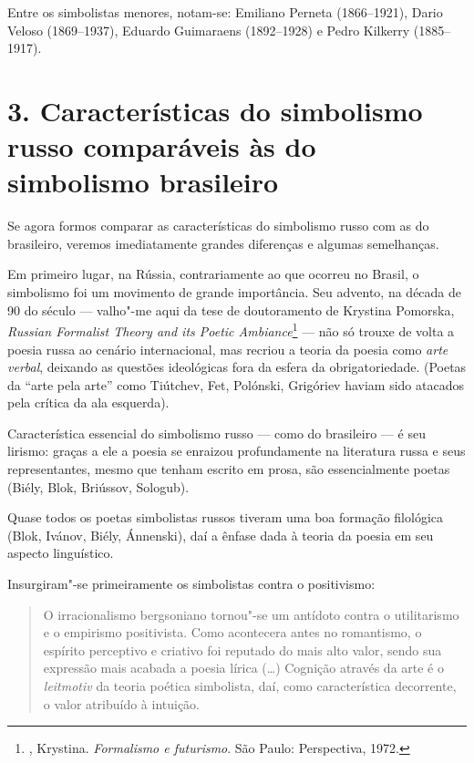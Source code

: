 Entre os simbolistas menores, notam-se: Emiliano Perneta (1866--1921),
Dario Veloso (1869--1937), Eduardo Guimaraens (1892--1928) e Pedro
Kilkerry (1885--1917).

\section{3. Características do simbolismo russo comparáveis às do
simbolismo brasileiro}

Se agora formos comparar as características do simbolismo russo com as
do brasileiro, veremos imediatamente grandes diferenças e algumas
semelhanças.

Em primeiro lugar, na Rússia, contrariamente ao que ocorreu no Brasil, o
simbolismo foi um movimento de grande importância. Seu advento, na
década de 90 do século  --- valho"-me aqui da tese de doutoramento de
Krystina Pomorska, \emph{Russian Formalist Theory and its Poetic
Ambiance}\footnote{, Krystina. \emph{Formalismo e futurismo}.
  São Paulo: Perspectiva, 1972.} --- não só trouxe de volta a poesia
russa ao cenário internacional, mas recriou a teoria da poesia como
\emph{arte verbal}, deixando as questões ideológicas fora da esfera da
obrigatoriedade. (Poetas da ``arte pela arte'' como Tiútchev, Fet,
Polónski, Grigóriev haviam sido atacados pela crítica da ala esquerda).

Característica essencial do simbolismo russo --- como do brasileiro --- é
seu lirismo: graças a ele a poesia se enraizou profundamente na
literatura russa e seus representantes, mesmo que tenham escrito em
prosa, são essencialmente poetas (Biély, Blok, Briússov, Sologub).

Quase todos os poetas simbolistas russos tiveram uma boa formação
filológica (Blok, Ivánov, Biély, Ánnenski), daí a ênfase dada à teoria
da poesia em seu aspecto linguístico.

Insurgiram"-se primeiramente os simbolistas contra o positivismo:

\begin{quote}
O irracionalismo bergsoniano tornou"-se um antídoto contra o utilitarismo
e o empirismo positivista. Como acontecera antes no romantismo, o
espírito perceptivo e criativo foi reputado do mais alto valor, sendo
sua expressão mais acabada a poesia lírica (\ldots{}) Cognição através da
arte é o \emph{leitmotiv} da teoria poética simbolista, daí, como
característica decorrente, o valor atribuído à intuição.
\end{quote}


